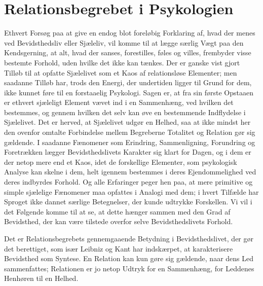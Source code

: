 \documentclass[12pt]{article}
\newcommand{\opage}[1]{\marginnote{\footnotesize\textit{[#1]}}}
\begin{document}
\section{Relationsbegrebet i Psykologien}
\label{sec:2}

Ethvert Forsøg paa at give en endog blot foreløbig Forklaring af, hvad der menes
ved Bevidsthedsliv eller Sjæleliv, vil komme til at lægge særlig Vægt paa den
Kendsgerning, at alt, hvad der sanses, forestilles, føles og villes, frembyder
visse bestemte Forhold, uden hvilke det ikke kan tænkes. Der er ganske vist
gjort Tilløb til at opfatte Sjælelivet som et Kaos af relationsløse Elementer;
men saadanne Tilløb har, trods den Energi, der undertiden ligger til Grund for
dem, ikke kunnet føre til en forstaaelig Psykologi. Sagen er, at fra sin første
Opstaaen er ethvert sjæleligt Element vævet ind i en Sammenhæng, ved hvilken det
bestemmes, og gennem hvilken det selv kan øve en bestemmende Indflydelse i
Sjælelivet. Det er herved, at Sjælelivet udgør en Helhed, saa at ikke mindst her
den ovenfor omtalte Forbindelse mellem Begreberne Totalitet og Relation gør sig
gældende. I saadanne Fænomener som Erindring, Sammenligning, Forundring og
Foretrækken lægger Bevidsthedslivets Karakter sig klart for Dagen, og i dem er
der netop mere end et Kaos, idet de forskellige
\opage{17} \setcounter{footnote}{0}%
Elementer, som psykologisk Analyse kan skelne i dem, helt igennem bestemmes i
deres Ejendommelighed ved deres indbyrdes Forhold. Og alle Erfaringer peger hen
paa, at mere primitive og simple sjælelige Fænomener maa opfattes i Analogi med
dem; i hvert Tilfælde har Sproget ikke dannet særlige Betegnelser, der kunde
udtrykke Forskellen. Vi vil i det Følgende komme til at se, at dette hænger
sammen med den Grad af Bevidsthed, der kan være tilstede overfor selve
Bevidsthedslivets Forhold.

Det er Relationsbegrebets gennemgaaende Betydning i Bevidsthedslivet, der gør
det berettiget, som især Leibniz og Kant har indskærpet, at karakterisere
Bevidsthed som Syntese. En Relation kan kun gøre sig gældende, naar dens Led
sammenfattes; Relationen er jo netop Udtryk for en Sammenhæng, for Leddenes
Henhøren til en Helhed.
\end{document}
